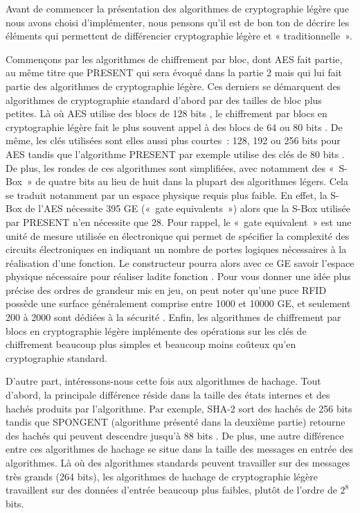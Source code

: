 			Avant de commencer la présentation des algorithmes de cryptographie légère que
		nous avons choisi d’implémenter, nous pensons qu’il est de bon ton de décrire
		les éléments qui permettent de différencier cryptographie légère et «
		traditionnelle ».

			Commençons par les algorithmes de chiffrement par bloc, dont AES fait partie,
		au même titre que PRESENT qui sera évoqué dans la partie 2 mais qui lui fait
		partie des algorithmes de cryptographie légère. Ces derniers se démarquent des
		algorithmes de cryptographie standard d’abord par des tailles de bloc plus
		petites. Là où AES utilise des blocs de 128 bits \cite{AES-FIPS}, le
		chiffrement par blocs en cryptographie légère fait le plus souvent appel à des
		blocs de 64 ou 80 bits \cite{Report_light}. De même, les clés utilisées sont
		elles aussi plus courtes : 128, 192 ou 256 bits pour AES \cite{AES-FIPS}
		tandis que l’algorithme PRESENT par exemple utilise des clés de 80 bits
		\cite{PRESENT}. De plus, les rondes de ces algorithmes sont simplifiées, avec
		notamment des « S-Box » de quatre bits au lieu de huit dans la plupart des
		algorithmes légers. Cela se traduit notamment par un espace physique requis
		plus faible. En effet, la S-Box de l’AES nécessite 395 GE \cite{RFID} (« gate
		equivalents ») alors que la S-Box utilisée par PRESENT n’en nécessite que 28.
		Pour rappel, le « gate equivalent » est une unité de mesure utilisée en
		électronique qui permet de spécifier la complexité des circuits électroniques
		en indiquant un nombre de portes logiques nécessaires à la réalisation d’une
		fonction. Le constructeur pourra alors avec ce GE savoir l’espace physique
		nécessaire pour réaliser ladite fonction \cite{wiki_gate}. Pour vous donner
		une idée plus précise des ordres de grandeur mis en jeu, on peut noter qu’une
		puce RFID possède une surface généralement comprise entre 1000 et 10000 GE, et
		seulement 200 à 2000 sont dédiées à la sécurité \cite{Report_light}. Enfin,
		les algorithmes de chiffrement par blocs en cryptographie légère implémente
		des opérations sur les clés de chiffrement beaucoup plus simples et beaucoup
		moins coûteux qu’en cryptographie standard.

			D’autre part, intéressons-nous cette fois aux algorithmes de hachage. Tout
		d’abord, la principale différence réside dans la taille des états internes et
		des hachés produits par l’algorithme. Par exemple, SHA-2 sort des hachés de
		256 bits tandis que SPONGENT (algorithme présenté dans la deuxième partie)
		retourne des hachés qui peuvent descendre jusqu’à 88 bits \cite{6275435}. De
		plus, une autre différence entre ces algorithmes de hachage se situe dans la
		taille des messages en entrée des algorithmes. Là où des algorithmes standards
		peuvent travailler sur des messages très grands (264 bits), les algorithmes de
		hachage de cryptographie légère travaillent sur des données d’entrée beaucoup
		plus faibles, plutôt de l’ordre de $2^8$ bits.

